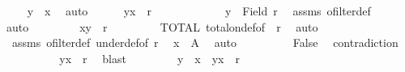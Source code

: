 \begin{isabellebody}
\ {\isacharasterisk}{\kern0pt}{\isacharasterisk}{\kern0pt}\ \isamarkupfalse%
\ {}{\isacharcolon}{\kern0pt}\ {\isachardoublequoteopen}y\ {\isasymnoteq}\ x{\isachardoublequoteclose}\ \isamarkupfalse%
\ auto\isanewline
\ \ \ \ \isacommand{{\isacharbraceleft}{\kern0pt}}\isamarkupfalse%
\isamarkupfalse%
\ {\isachardoublequoteopen}{\isacharparenleft}{\kern0pt}y{\isacharcomma}{\kern0pt}x{\isacharparenright}{\kern0pt}\ {\isasymnotin}\ r{\isachardoublequoteclose}\isanewline
\ \ \ \ \ \isamarkupfalse%
\isanewline
\ \ \ \ \ \isamarkupfalse%
\ {\isachardoublequoteopen}y\ {\isasymin}\ Field\ r{\isachardoublequoteclose}\ \isamarkupfalse%
\ assms\ ofilter{\isacharunderscore}{\kern0pt}def\ {\isacharasterisk}{\kern0pt}{\isacharasterisk}{\kern0pt}{\isacharasterisk}{\kern0pt}\ \isamarkupfalse%
\ auto\isanewline
\ \ \ \ \ \isamarkupfalse%
\ \isamarkupfalse%
\ {\isachardoublequoteopen}{\isacharparenleft}{\kern0pt}x{\isacharcomma}{\kern0pt}y{\isacharparenright}{\kern0pt}\ {\isasymin}\ r{\isachardoublequoteclose}\isanewline
\ \ \ \ \ \isamarkupfalse%
\ {}\ {\isacharasterisk}{\kern0pt}\ TOTAL\ total{\isacharunderscore}{\kern0pt}on{\isacharunderscore}{\kern0pt}def{\isacharbrackleft}{\kern0pt}of\ {\isacharunderscore}{\kern0pt}\ r{\isacharbrackright}{\kern0pt}\ \isamarkupfalse%
\ auto\isanewline
\ \ \ \ \ \isamarkupfalse%
\ {\isacharasterisk}{\kern0pt}{\isacharasterisk}{\kern0pt}{\isacharasterisk}{\kern0pt}\ assms\ ofilter{\isacharunderscore}{\kern0pt}def\ under{\isacharunderscore}{\kern0pt}def{\isacharbrackleft}{\kern0pt}of\ r{\isacharbrackright}{\kern0pt}\ \isamarkupfalse%
\ {\isachardoublequoteopen}x\ {\isasymin}\ A{\isachardoublequoteclose}\ \isamarkupfalse%
\ auto\isanewline
\ \ \ \ \ \isamarkupfalse%
\ {\isacharasterisk}{\kern0pt}{\isacharasterisk}{\kern0pt}\ \isamarkupfalse%
\ False\ \isamarkupfalse%
\ contradiction\isanewline
\ \ \ \ \isacommand{{\isacharbraceright}{\kern0pt}}\isamarkupfalse%
\isanewline
\ \ \ \ \isamarkupfalse%
\ {\isachardoublequoteopen}{\isacharparenleft}{\kern0pt}y{\isacharcomma}{\kern0pt}x{\isacharparenright}{\kern0pt}\ {\isasymin}\ r{\isachardoublequoteclose}\ \isamarkupfalse%
\ blast\isanewline
\ \ \ \ \isamarkupfalse%
\ {}\ \isamarkupfalse%
\ {\isachardoublequoteopen}y\ {\isasymnoteq}\ x\ {\isasymand}\ {\isacharparenleft}{\kern0pt}y{\isacharcomma}{\kern0pt}x{\isacharparenright}{\kern0pt}\ {\isasymin}\ r{\isachardoublequoteclose}\ \isamarkupfalse%

\end{isabellebody}
